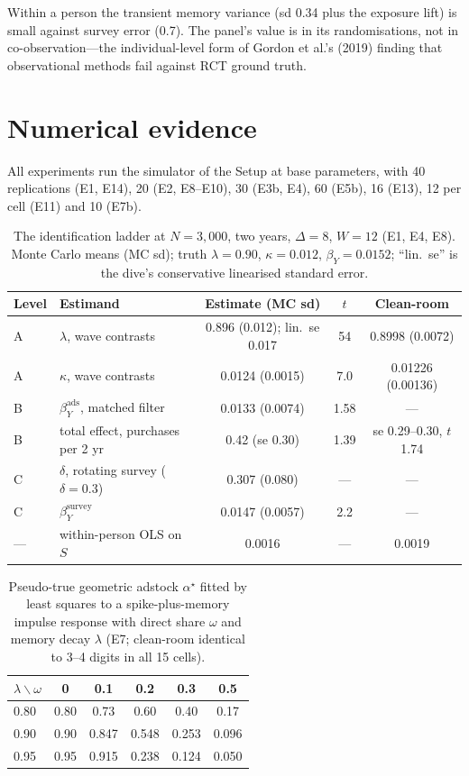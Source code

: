 Within a person the transient memory variance (sd 0.34 plus the exposure lift) is small against survey error (0.7). The panel's value is in its randomisations, not in co-observation---the individual-level form of Gordon et al.'s (2019) finding that observational methods fail against RCT ground truth.

\section{Numerical evidence}

All experiments run the simulator of the Setup at base parameters, with 40 replications (E1, E14), 20 (E2, E8--E10), 30 (E3b, E4), 60 (E5b), 16 (E13), 12 per cell (E11) and 10 (E7b).

\begin{table}[htbp]
\centering\small
\caption{The identification ladder at $N = 3{,}000$, two years, $\Delta = 8$, $W = 12$ (E1, E4, E8). Monte Carlo means (MC sd); truth $\lambda = 0.90$, $\kappa = 0.012$, $\beta_Y = 0.0152$; ``lin.\ se'' is the dive's conservative linearised standard error.}
\label{panel:tab:levels}
\begin{tabular}{llccc}
\toprule
Level & Estimand & Estimate (MC sd) & $t$ & Clean-room \\
\midrule
A & $\lambda$, wave contrasts & 0.896 (0.012); lin.\ se 0.017 & 54 & 0.8998 (0.0072) \\
A & $\kappa$, wave contrasts & 0.0124 (0.0015) & 7.0 & 0.01226 (0.00136) \\
B & $\beta_Y^{\mathrm{ads}}$, matched filter & 0.0133 (0.0074) & 1.58 & --- \\
B & total effect, purchases per 2 yr & 0.42 (se 0.30) & 1.39 & se 0.29--0.30, $t$ 1.74 \\
C & $\delta$, rotating survey ($\delta = 0.3$) & 0.307 (0.080) & --- & --- \\
C & $\beta_Y^{\mathrm{survey}}$ & 0.0147 (0.0057) & 2.2 & --- \\
--- & within-person OLS on $S$ & 0.0016 & --- & 0.0019 \\
\bottomrule
\end{tabular}
\end{table}

\begin{table}[htbp]
\centering\small
\caption{Pseudo-true geometric adstock $\alpha^\star$ fitted by least squares to a spike-plus-memory impulse response with direct share $\omega$ and memory decay $\lambda$ (E7; clean-room identical to 3--4 digits in all 15 cells).}
\label{panel:tab:adstock}
\begin{tabular}{lccccc}
\toprule
$\lambda \backslash \omega$ & 0 & 0.1 & 0.2 & 0.3 & 0.5 \\
\midrule
0.80 & 0.80 & 0.73 & 0.60 & 0.40 & 0.17 \\
0.90 & 0.90 & 0.847 & 0.548 & 0.253 & 0.096 \\
0.95 & 0.95 & 0.915 & 0.238 & 0.124 & 0.050 \\
\bottomrule
\end{tabular}
\end{table}

